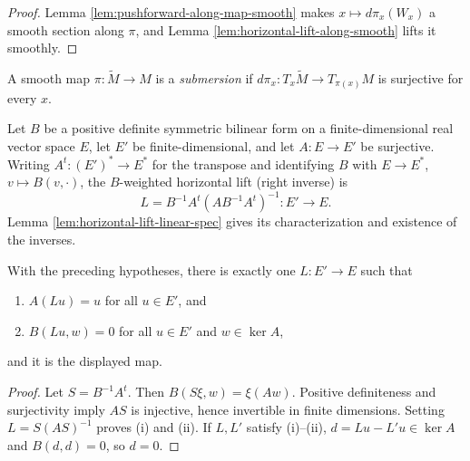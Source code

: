 \begin{proof}

\sketch Lemma \ref{lem:pushforward-along-map-smooth} makes $x\mapsto d\pi_x(W_x)$ a smooth section along $\pi$, and Lemma \ref{lem:horizontal-lift-along-smooth} lifts it smoothly.
\end{proof}

\begin{definition}
\label{def:submersion}




A smooth map $\pi:\tilde M\to M$ is a \emph{submersion} if $d\pi_x:T_x\tilde M\to T_{\pi(x)}M$ is surjective for every $x$.
\end{definition}

\begin{definition}
\label{def:horizontal-lift-linear}




Let $B$ be a positive definite symmetric bilinear form on a finite-dimensional real vector space $E$, let $E'$ be finite-dimensional, and let $A:E\to E'$ be surjective. Writing $A^t:(E')^*\to E^*$ for the transpose and identifying $B$ with $E\to E^*$, $v\mapsto B(v,\cdot)$, the $B$-weighted horizontal lift (right inverse) is
\[
L=B^{-1}A^t(AB^{-1}A^t)^{-1}:E'\to E.
\]
Lemma \ref{lem:horizontal-lift-linear-spec} gives its characterization and existence of the inverses.
\end{definition}

\begin{lemma}
\label{lem:horizontal-lift-linear-spec}





With the preceding hypotheses, there is exactly one $L:E'\to E$ such that
\begin{enumerate}
\item[(i)] $A(Lu)=u$ for all $u\in E'$, and
\item[(ii)] $B(Lu,w)=0$ for all $u\in E'$ and $w\in\ker A$,
\end{enumerate}
and it is the displayed map.
\end{lemma}

\begin{proof}

\sketch Let $S=B^{-1}A^t$. Then $B(S\xi,w)=\xi(Aw)$. Positive definiteness and surjectivity imply $AS$ is injective, hence invertible in finite dimensions. Setting $L=S(AS)^{-1}$ proves (i) and (ii). If $L,L'$ satisfy (i)--(ii), $d=Lu-L'u\in\ker A$ and $B(d,d)=0$, so $d=0$.
\end{proof}

